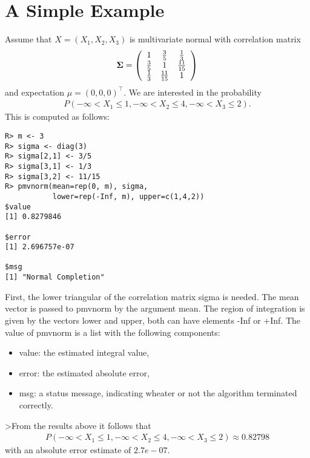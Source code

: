 \documentclass[11pt]{amsart}
\newcommand{\Sig}{\mbox{\boldmath $\Sigma$}}
\begin{document}
\section{A Simple Example \label{simple}}

Assume that $ X = (X_1, X_2, X_3) $ is multivariate normal with correlation
matrix
\begin{eqnarray*}
\Sig = \left( \begin{array}{ccc} 1 & \frac{3}{5} & \frac{1}{3} \\
\frac{3}{5} & 1 & \frac{11}{15} \\
\frac{1}{3} & \frac{11}{15} & 1 \end{array} \right)
\end{eqnarray*}
and expectation $ \mu = (0,0,0)^{\top} $. We are interested in the probability
\begin{eqnarray*}
P(-\infty < X_1 \le 1, -\infty < X_2 \le 4, -\infty < X_3 \le 2).
\end{eqnarray*}
This is computed as follows:
\begin{verbatim}
R> m <- 3
R> sigma <- diag(3)
R> sigma[2,1] <- 3/5
R> sigma[3,1] <- 1/3
R> sigma[3,2] <- 11/15
R> pmvnorm(mean=rep(0, m), sigma,
           lower=rep(-Inf, m), upper=c(1,4,2))
$value
[1] 0.8279846

$error
[1] 2.696757e-07

$msg
[1] "Normal Completion"
\end{verbatim}
First, the lower triangular of the correlation matrix {\ttfamily sigma}
is needed. The mean
vector is passed to {\ttfamily pmvnorm} by the argument {\ttfamily mean}.
The region of
integration is given by the vectors {\ttfamily lower} and {\ttfamily upper},
both can have elements {\ttfamily -Inf} or {\ttfamily +Inf}. The value of {\ttfamily pmvnorm}
is a list with the following components:
\begin{itemize}
\item {\ttfamily value}: the estimated integral value,
\item {\ttfamily error}: the estimated absolute error,
\item {\ttfamily msg}: a status message, indicating wheater or not the algorithm
terminated correctly.
\end{itemize}
>From the results above it follows that
\begin{eqnarray*}
P(-\infty < X_1 \le 1, -\infty < X_2 \le 4, -\infty < X_3 \le 2) \approx
0.82798
\end{eqnarray*}
with an absolute error estimate of $2.7e-07$.
\end{document}
